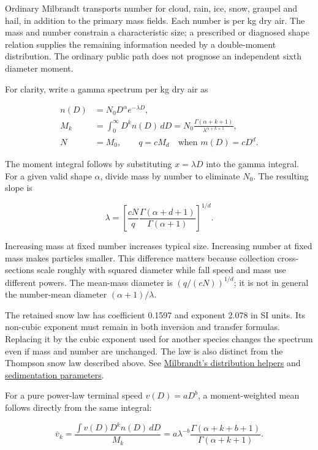 \documentclass[
  11pt,
]{report}
\begin{document}
Ordinary Milbrandt transports number for cloud, rain, ice, snow, graupel
and hail, in addition to the primary mass fields. Each number is per kg
dry air. The mass and number constrain a characteristic size; a
prescribed or diagnosed shape relation supplies the remaining
information needed by a double-moment distribution. The ordinary public
path does not prognose an independent sixth diameter moment.

For clarity, write a gamma spectrum per kg dry air as

\[\begin{aligned}
n(D) &= N_0D^\alpha e^{-\lambda D}, \\
M_k &= \int_0^\infty D^k n(D)\,dD
     = N_0\frac{\Gamma(\alpha+k+1)}{\lambda^{\alpha+k+1}}, \\
N &= M_0,\qquad q=cM_d
       \quad\text{when }m(D)=cD^d.
\end{aligned}\]

The moment integral follows by substituting \(x=\lambda D\) into the
gamma integral. For a given valid shape \(\alpha\), divide mass by
number to eliminate \(N_0\). The resulting slope is

\[\lambda=
\left[
\frac{cN}{q}\frac{\Gamma(\alpha+d+1)}{\Gamma(\alpha+1)}
\right]^{1/d}.\]

Increasing mass at fixed number increases typical size. Increasing
number at fixed mass makes particles smaller. This difference matters
because collection cross-sections scale roughly with squared diameter
while fall speed and mass use different powers. The mean-mass diameter
is \((q/(cN))^{1/d}\); it is not in general the number-mean diameter
\((\alpha+1)/\lambda\).

The retained snow law has coefficient 0.1597 and exponent 2.078 in SI
units. Its non-cubic exponent must remain in both inversion and transfer
formulas. Replacing it by the cubic exponent used for another species
changes the spectrum even if mass and number are unchanged. The law is
also distinct from the Thompson snow law described above. See
\href{../src/microphysics/schemes/milbrandt/distribution.hpp}{Milbrandt's
distribution helpers} and
\href{../src/microphysics/schemes/milbrandt/sedimentation.hpp}{sedimentation
parameters}.

For a pure power-law terminal speed \(v(D)=aD^b\), a moment-weighted
mean follows directly from the same integral:

\[\overline v_k
=\frac{\int v(D)D^kn(D)\,dD}{M_k}
=a\lambda^{-b}
 \frac{\Gamma(\alpha+k+b+1)}{\Gamma(\alpha+k+1)}.\]
\end{document}
